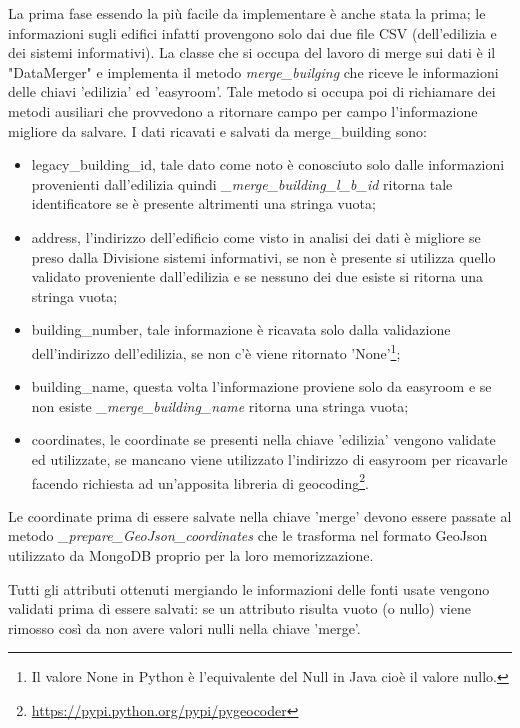 \documentclass[12pt]{report}
\begin{document}
La prima fase essendo la più facile da implementare è anche stata la prima; le informazioni sugli edifici infatti provengono solo dai due file CSV (dell'edilizia e dei sistemi informativi).
La classe che si occupa del lavoro di merge sui dati è il "DataMerger" e implementa il metodo \textit{merge\_builging} che riceve le informazioni delle chiavi 'edilizia' ed 'easyroom'. Tale metodo si occupa poi di richiamare dei metodi ausiliari che provvedono a ritornare campo per campo l'informazione migliore da salvare. I dati ricavati e salvati da merge\_building sono:
\begin{itemize}
\item legacy\_building\_id, tale dato come noto è conosciuto solo dalle informazioni provenienti dall'edilizia quindi \textit{\_merge\_building\_l\_b\_id} ritorna tale identificatore se è presente altrimenti una stringa vuota;
\item address, l'indirizzo dell'edificio come visto in analisi dei dati è migliore se preso dalla Divisione sistemi informativi, se non è presente si utilizza quello validato proveniente dall'edilizia e se nessuno dei due esiste si ritorna una stringa vuota;
\item building\_number, tale informazione è ricavata solo dalla validazione dell'indirizzo dell'edilizia, se non c'è viene ritornato 'None'\footnote{Il valore None in Python è l'equivalente del Null in Java cioè il valore nullo.};
\item building\_name, questa volta l'informazione proviene solo da easyroom e se non esiste \textit{\_merge\_building\_name} ritorna una stringa vuota;
\item coordinates, le coordinate se presenti nella chiave 'edilizia' vengono validate ed utilizzate, se mancano viene utilizzato l'indirizzo di easyroom per ricavarle facendo richiesta ad un'apposita libreria di geocoding\footnote{\url{https://pypi.python.org/pypi/pygeocoder}}. 
\end{itemize}

\vspace{5mm} %

Le coordinate prima di essere salvate nella chiave 'merge' devono essere passate al metodo \textit{\_prepare\_GeoJson\_coordinates} che le trasforma nel formato GeoJson utilizzato da MongoDB proprio per la loro memorizzazione.

Tutti gli attributi ottenuti mergiando le informazioni delle fonti usate vengono validati prima di essere salvati: se un attributo risulta vuoto (o nullo) viene rimosso così da non avere valori nulli nella chiave 'merge'.
\end{document}
